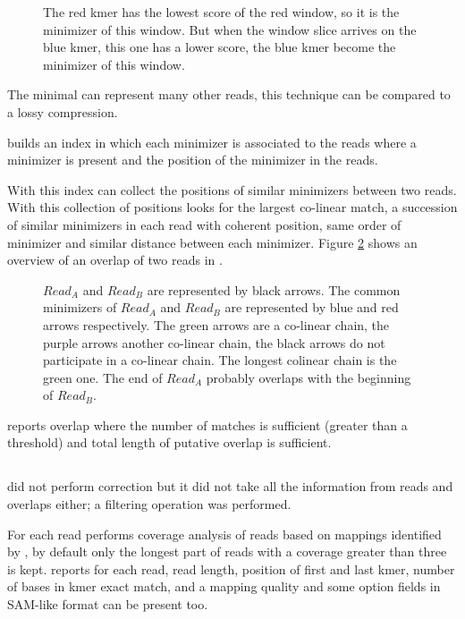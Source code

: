\documentclass[main]{subfiles}
\begin{document}
\begin{figure}[ht]
    \centering
    
    \caption{The red kmer has the lowest score of the red window, so it is the minimizer of this window. But when the window slice arrives on the blue kmer, this one has a lower score, the blue kmer become the minimizer of this window.}
    \label{sota:fig:miniasm:minimizer}
\end{figure}

The minimal \kmer can represent many other reads, this technique can be compared to a lossy compression.

\minimap builds an index in which each minimizer is associated to the reads where a minimizer is present and the position of the minimizer in the reads.

With this index \minimap can collect the positions of similar minimizers between two reads. With this collection of positions \minimap looks for the largest co-linear match, a succession of similar minimizers in each read with coherent position, same order of minimizer and similar distance between each minimizer. Figure \ref{sota:fig:miniasm:mapping} shows an overview of an overlap of two reads in \minimap.

\begin{figure}[ht]
    \centering
    
    \caption{$Read_A$ and $Read_B$ are represented by black arrows. The common minimizers of $Read_A$ and $Read_B$ are represented by blue and red arrows respectively. The green arrows are a co-linear chain, the purple arrows another co-linear chain, the black arrows do not participate in a co-linear chain. The longest colinear chain is the green one. The end of $Read_A$ probably overlaps with the beginning of $Read_B$.}
    \label{sota:fig:miniasm:mapping}
\end{figure}

\minimap reports overlap where the number of matches is sufficient (greater than a threshold) and  total length of putative overlap is sufficient. 

\subsection{\miniasm}

\miniasm did not perform correction but it did not take all the information from reads and overlaps either; a filtering operation was performed.

For each read \miniasm performs coverage analysis of reads based on mappings identified by \minimap, by default only the longest part of reads with a coverage greater than three is kept. \minimap reports for each read, read length, position of first and last kmer, number of bases in kmer exact match, and a mapping quality and some option fields in SAM-like format can be present too.
\end{document}

